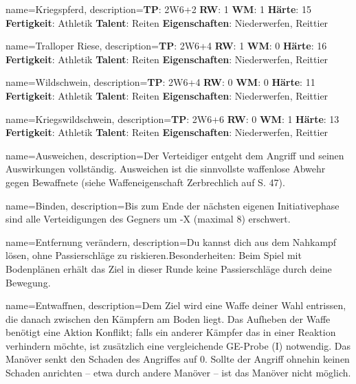 {
    name={Kriegspferd},
    description={\textbf{TP}: 2W6+2 \textbf{RW}: 1 \textbf{WM}: 1 \textbf{Härte}: 15        \textbf{Fertigkeit}: Athletik \textbf{Talent}: Reiten \textbf{{Eigenschaften}}: Niederwerfen, Reittier}
}



{
    name={Tralloper Riese},
    description={\textbf{TP}: 2W6+4 \textbf{RW}: 1 \textbf{WM}: 0 \textbf{Härte}: 16        \textbf{Fertigkeit}: Athletik \textbf{Talent}: Reiten \textbf{{Eigenschaften}}: Niederwerfen, Reittier}
}



{
    name={Wildschwein},
    description={\textbf{TP}: 2W6+4 \textbf{RW}: 0 \textbf{WM}: 0 \textbf{Härte}: 11        \textbf{Fertigkeit}: Athletik \textbf{Talent}: Reiten \textbf{{Eigenschaften}}: Niederwerfen, Reittier}
}



{
    name={Kriegswildschwein},
    description={\textbf{TP}: 2W6+6 \textbf{RW}: 0 \textbf{WM}: 1 \textbf{Härte}: 13        \textbf{Fertigkeit}: Athletik \textbf{Talent}: Reiten \textbf{{Eigenschaften}}: Niederwerfen, Reittier}
}


{
    name={Ausweichen},
    description={Der Verteidiger entgeht dem Angriff und seinen Auswirkungen vollständig. Ausweichen ist die sinnvollste waffenlose Abwehr gegen Bewaffnete (siehe Waffeneigenschaft Zerbrechlich auf S. 47).}
}


{
    name={Binden},
    description={Bis zum Ende der nächsten eigenen Initiativephase sind alle Verteidigungen des Gegners um -X (maximal 8) erschwert.}
}


{
    name={Entfernung verändern},
    description={Du kannst dich aus dem Nahkampf lösen, ohne Passierschläge zu riskieren.\newline Besonderheiten: Beim Spiel mit Bodenplänen erhält das Ziel in dieser Runde keine Passierschläge durch deine Bewegung.}
}


{
    name={Entwaffnen},
    description={Dem Ziel wird eine Waffe deiner Wahl entrissen, die danach zwischen den Kämpfern am Boden liegt. Das Aufheben der Waffe benötigt eine Aktion Konflikt; falls ein anderer Kämpfer das in einer Reaktion verhindern möchte, ist zusätzlich eine vergleichende GE-Probe (I) notwendig. Das Manöver senkt den Schaden des Angriffes auf 0. Sollte der Angriff ohnehin keinen Schaden anrichten – etwa durch andere Manöver – ist das Manöver nicht möglich.}
}


